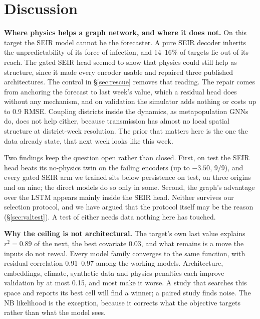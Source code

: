 \section{Discussion}
\label{sec:discussion}

\textbf{Where physics helps a graph network, and where it does not.} On this
target the SEIR model cannot be the forecaster. A pure SEIR decoder inherits the
unpredictability of its force of infection, and 14--16\% of targets lie out of its
reach. The gated SEIR head seemed to show that physics could still help as
structure, since it made every encoder usable and repaired three published
architectures. The control in \S\ref{sec:rescue} removes that reading. The repair
comes from anchoring the forecast to last week's value, which a residual head
does without any mechanism, and on validation the simulator adds nothing or
costs up to 0.9 RMSE. Coupling districts inside the dynamics, as metapopulation
GNNs do, does not help either, because transmission has almost no local spatial
structure at district-week resolution. The prior that matters here is the one
the data already state, that next week looks like this week.

Two findings keep the question open rather than closed. First, on test the SEIR
head beats its no-physics twin on the failing encoders (up to $-3.50$, 9/9), and
every gated SEIR arm we trained sits below persistence on test, on three origins
and on nine; the direct models do so only in some. Second, the graph's advantage
over the LSTM appears mainly inside the SEIR head. Neither survives our selection protocol, and we have argued that the
protocol itself may be the reason (\S\ref{sec:valtest}). A test of either needs
data nothing here has touched.

\textbf{Why the ceiling is not architectural.} The target's own last value
explains $r^2=0.89$ of the next, the best covariate 0.03, and what remains is a
move the inputs do not reveal. Every model family converges to the same
function, with residual correlation 0.91--0.97 among the working models.
Architecture, embeddings, climate, synthetic data and physics penalties each
improve validation by at most 0.15, and most make it worse. A study that searches this space and reports its best
cell will find a winner; a paired study finds noise. The NB likelihood is the
exception, because it corrects what the objective targets rather than what the
model sees.

